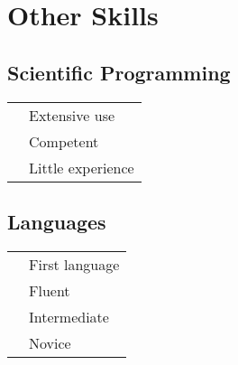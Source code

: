 \documentclass[12pt]{friggeri-cv}
\newcommand{\cvSkillsTwoCols}[2]{
  \begin{minipage}[t]{.5\textwidth}#1\end{minipage}
  \hfill
  \begin{minipage}[t]{.4\textwidth}#2\end{minipage}
}
\begin{document}
\section{Other Skills}
\cvSkillsTwoCols{
\subsection{Scientific Programming}
\vspace{5pt}
\begin{tabular}{rl}
     {\thinfont\color{headercolor}{MATLAB / Julia}} & {Extensive use}\\
     {\thinfont\color{headercolor}{java / C++}} & {Competent}\\
     {\thinfont\color{headercolor}{Ruby / Python / Stan}} & {Little experience}\\
\end{tabular}
}{
\subsection{Languages}
\vspace{5pt}
\begin{tabular}{rl}
     {\thinfont\color{headercolor}{French}} & {First language}  \\
     {\thinfont\color{headercolor}{English}} & {Fluent}\\
     {\thinfont\color{headercolor}{Italian}} & {Intermediate}  \\
     {\thinfont\color{headercolor}{Japanese}} & {Novice}\\
\end{tabular}
}













\newpage





\newpage
\end{document}
